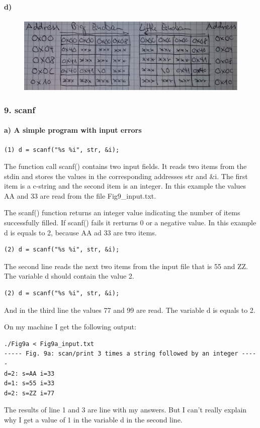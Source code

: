 \documentclass[12pt]{article}
\begin{document}
\paragraph*{d)}
\quad
\begin{figure}[!htb]
\centering
\includegraphics[scale=0.75]{mem_d.eps} 
\end{figure}


\subsubsection*{9. scanf}
\paragraph*{a) A simple program with input errors}
\quad
\begin{lstlisting}
(1) d = scanf("%s %i", str, &i);
\end{lstlisting}
The function call scanf() contains two input fields. It reads two items from the stdin and stores the values in the corresponding addresses str and \&i. The first item is a c-string and the second item is an integer. In this example the values AA and 33 are read from the file Fig9\_input.txt.

The scanf() function returns an integer value indicating the number of items successfully filled. If scanf() fails it rerturns 0 or a negative value. In this example d is equals to 2, because AA ad 33 are two items.

\begin{lstlisting}
(2) d = scanf("%s %i", str, &i);
\end{lstlisting}
The second line reads the next two items from the input file that is 55 and ZZ. The variable d should contain the value 2.

\begin{lstlisting}
(2) d = scanf("%s %i", str, &i);
\end{lstlisting}
And in the third line the values 77 and 99 are read. The variable d is equals to 2.

On my machine I get the following output:
\begin{lstlisting}
./Fig9a < Fig9a_input.txt
----- Fig. 9a: scan/print 3 times a string followed by an integer -----
d=2: s=AA i=33
d=1: s=55 i=33
d=2: s=ZZ i=77

\end{lstlisting}
The results of line 1 and 3 are line with my answers. But I can't really explain why I get a value of 1 in the variable d in the second line. 
\end{document}
